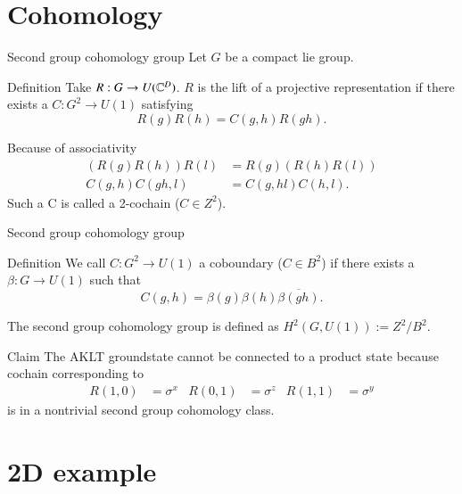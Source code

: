 \documentclass{beamer}
\begin{document}
\section{Cohomology}

\begin{frame}{Second group cohomology group}
	Let $G$ be a compact lie group.
	\begin{block}{Definition}
		Take $R:G\rightarrow U(\mathbb{C}^D)$. $R$ is the lift of a projective representation if there exists a $C:G^2\rightarrow U(1)$ satisfying
		\[R(g)R(h)=C(g,h)R(gh).\]
	\end{block}
	\pause
	Because of associativity
	\begin{align*}
		(R(g)R(h))R(l)&=R(g)(R(h)R(l))\\
		C(g,h)C(gh,l)&=C(g,hl)C(h,l).
	\end{align*}
	Such a C is called a 2-cochain ($C\in Z^2$).
\end{frame}

\begin{frame}{Second group cohomology group}
	\begin{block}{Definition}
		We call $C:G^2\rightarrow U(1)$ a coboundary ($C\in B^2$) if there exists a $\beta:G\rightarrow U(1)$ such that
		\[C(g,h)=\beta(g)\beta(h)\overline{\beta(gh)}.\]
	\end{block}
	The second group cohomology group is defined as $H^2(G,U(1)):=Z^2/B^2$.
	\pause
	\begin{block}{Claim}
		The AKLT groundstate cannot be connected to a product state because cochain corresponding to
		\begin{align*}
			R(1,0)&=\sigma^x&R(0,1)&=\sigma^z&R(1,1)&=\sigma^y
		\end{align*}
		is in a nontrivial second group cohomology class.
	\end{block}
\end{frame}

\section{2D example}
\end{document}
